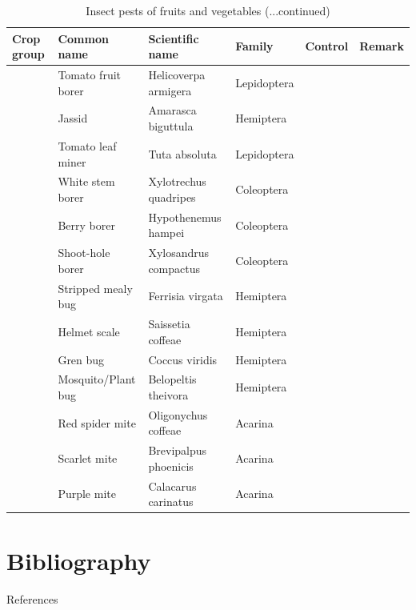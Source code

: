 \documentclass[10pt,dvipsnames,ignorenonframetext,aspectratio=169]{beamer}
\newif\ifbibliography
\begin{document}
\begin{frame}{}
\protect\hypertarget{section-19}{}
\begin{table}

\caption{\label{tab:unnamed-chunk-7}Insect pests of fruits and vegetables (...continued)}
\centering
\fontsize{5}{7}\selectfont
\begin{tabular}[t]{>{\raggedright\arraybackslash}p{6em}>{\raggedright\arraybackslash}p{10em}>{\raggedright\arraybackslash}p{14em}>{\raggedright\arraybackslash}p{12em}>{\raggedright\arraybackslash}p{8em}>{\raggedright\arraybackslash}p{8em}}
\toprule
Crop group & Common name & Scientific name & Family & Control & Remark\\
\midrule
 & Tomato fruit borer & Helicoverpa armigera & Lepidoptera &  & \\
\cmidrule{2-6}
 & Jassid & Amarasca biguttula & Hemiptera &  & \\
\cmidrule{2-6}
\multirow{-3}{6em}{\raggedright\arraybackslash Tomato} & Tomato leaf miner & Tuta absoluta & Lepidoptera &  & \\
\cmidrule{1-6}
 & White stem borer & Xylotrechus quadripes & Coleoptera &  & \\
\cmidrule{2-6}
 & Berry borer & Hypothenemus hampei & Coleoptera &  & \\
\cmidrule{2-6}
 & Shoot-hole borer & Xylosandrus compactus & Coleoptera &  & \\
\cmidrule{2-6}
 & Stripped mealy bug & Ferrisia virgata & Hemiptera &  & \\
\cmidrule{2-6}
 & Helmet scale & Saissetia coffeae & Hemiptera &  & \\
\cmidrule{2-6}
\multirow{-6}{6em}{\raggedright\arraybackslash Coffee} & Gren bug & Coccus viridis & Hemiptera &  & \\
\cmidrule{1-6}
 & Mosquito/Plant bug & Belopeltis theivora & Hemiptera &  & \\
\cmidrule{2-6}
 & Red spider mite & Oligonychus coffeae & Acarina &  & \\
\cmidrule{2-6}
 & Scarlet mite & Brevipalpus phoenicis & Acarina &  & \\
\cmidrule{2-6}
\multirow{-4}{6em}{\raggedright\arraybackslash Tea} & Purple mite & Calacarus carinatus & Acarina &  & \\
\bottomrule
\end{tabular}
\end{table}
\end{frame}

\hypertarget{bibliography}{%
\section{Bibliography}\label{bibliography}}

\begin{frame}{References}
\protect\hypertarget{references}{}
\end{frame}

          \begin{frame}[allowframebreaks]{}
    \bibliographytrue
    
    \end{frame}
  
\end{document}
